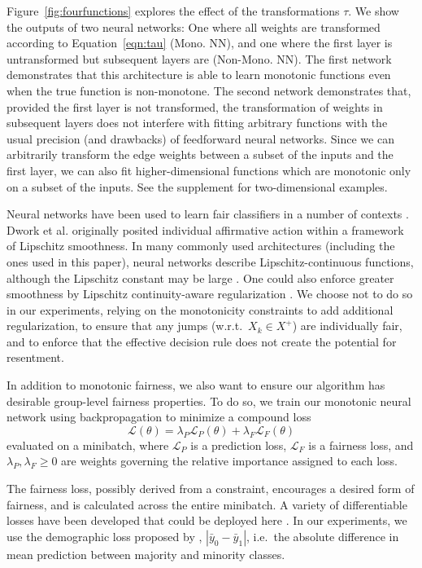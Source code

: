     Figure~\ref{fig:fourfunctions} explores the effect of the transformations $\tau$. We show the outputs of two neural networks: One where all weights are transformed according to Equation~\ref{eqn:tau} (Mono. NN), and one where the first layer is untransformed but subsequent layers are (Non-Mono. NN). The first network demonstrates that this architecture is able to learn monotonic functions even when the true function is non-monotone. The second network demonstrates that, provided the first layer is not transformed, the transformation of weights in subsequent layers does not interfere with fitting arbitrary functions with the usual precision (and drawbacks) of feedforward neural networks. Since we can arbitrarily transform the edge weights between a subset of the inputs and the first layer, we can also fit higher-dimensional functions which are monotonic only on a subset of the inputs.  See the supplement for two-dimensional examples.
  
    Neural networks have been used to learn fair classifiers in a number of contexts \citep{LouSweLiWelZem2016,BeuCheZhaChi2017,MadCrePitZem2018,xu2018fairgan}. Dwork et al. \cite{dwork2012fairness} originally posited individual affirmative action within a framework of Lipschitz smoothness. In many commonly used architectures (including the ones used in this paper), neural networks describe Lipschitz-continuous functions, although the Lipschitz constant may be large \citep{Szegedy:2014,gouk2018regularisation,Balan:Singh:Zou:2018}. One could also enforce greater smoothness by Lipschitz continuity-aware regularization \citep{gouk2018regularisation}. We choose not to do so in our experiments, relying on the monotonicity constraints to add additional regularization, to ensure that any jumps (w.r.t.~$X_k\in X^+$) are individually fair, and to enforce that the effective decision rule does not create the potential for resentment.

    In addition to monotonic fairness, we also want to ensure our algorithm has desirable group-level fairness properties. To do so, we train our monotonic neural network using backpropagation to minimize a compound loss
    $$\mathcal{L}(\theta) = \lambda_P \mathcal{L}_P(\theta) + \lambda_F \mathcal{L}_F(\theta)$$
    evaluated on a minibatch, where $\mathcal{L}_P$ is a prediction loss, $\mathcal{L}_F$ is a fairness loss, and $\lambda_P, \lambda_F \ge 0$ are weights governing the relative importance assigned to each loss. 
    
    The fairness loss, possibly derived from a constraint, encourages a desired form of fairness, and is calculated across the entire minibatch. A variety of differentiable losses have been developed that could be deployed here \cite{KamAkaSak2011,KamAkHidSak2012,berk2017convex,zafar2017parity,zafar2017aistats,AgaBeyDudLanWal2018}. In our experiments, we use the demographic loss proposed by \cite{ZemQiSwePitDwo2013}, $|\bar{y}_0 - \bar{y}_1|$, i.e.\ the absolute difference in mean prediction between majority and minority classes.  
    
